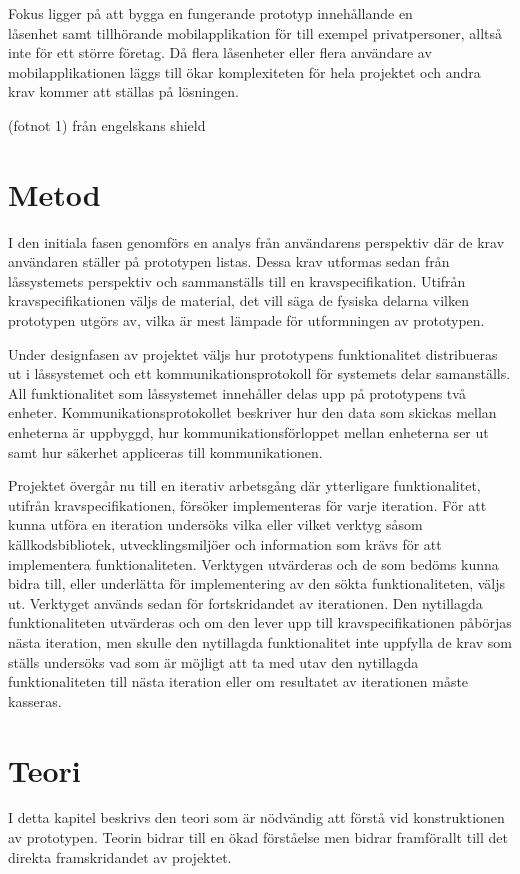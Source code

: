 \documentclass[11pt]{article}
\begin{document}
Fokus ligger på att bygga en fungerande prototyp innehållande en\\ låsenhet samt tillhörande mobilapplikation för till exempel privatpersoner, alltså inte för ett större företag. Då flera låsenheter eller flera användare av mobilapplikationen läggs till ökar komplexiteten för hela projektet och andra krav kommer att ställas på lösningen.

(fotnot 1) från engelskans shield


\section{Metod}
I den initiala fasen genomförs en analys från användarens perspektiv där de krav användaren ställer på prototypen listas. Dessa krav utformas sedan från låssystemets perspektiv och sammanställs till en kravspecifikation. Utifrån kravspecifikationen väljs de material, det vill säga de fysiska delarna vilken prototypen utgörs av, vilka är mest lämpade för utformningen av prototypen.

Under designfasen av projektet väljs hur prototypens funktionalitet distribueras ut i låssystemet och ett kommunikationsprotokoll för systemets delar samanställs. All funktionalitet som låssystemet innehåller delas upp på prototypens två enheter. Kommunikationsprotokollet beskriver hur den data som skickas mellan enheterna är uppbyggd, hur kommunikationsförloppet mellan enheterna ser ut samt hur säkerhet appliceras till kommunikationen.

Projektet övergår nu till en iterativ arbetsgång där ytterligare funktionalitet, utifrån kravspecifikationen, försöker implementeras för varje iteration. För att kunna utföra en iteration undersöks vilka eller vilket verktyg såsom källkodsbibliotek, utvecklingsmiljöer och information som krävs för att implementera funktionaliteten. Verktygen utvärderas och de som bedöms kunna bidra till, eller underlätta för implementering av den sökta funktionaliteten, väljs ut. Verktyget används sedan för fortskridandet av iterationen. Den nytillagda funktionaliteten utvärderas och om den lever upp till kravspecifikationen påbörjas nästa iteration, men skulle den nytillagda funktionalitet inte uppfylla de krav som ställs undersöks vad som är möjligt att ta med utav den nytillagda funktionaliteten till nästa iteration eller om resultatet av iterationen måste kasseras. 


\section{Teori}
I detta kapitel beskrivs den teori som är nödvändig att förstå vid konstruktionen av prototypen. Teorin bidrar till en ökad förståelse men bidrar framförallt till det direkta framskridandet av projektet.  
\end{document}
